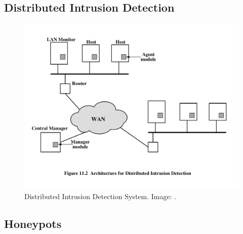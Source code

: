 \subsection{Distributed Intrusion Detection}

\begin{frame}
  \begin{figure}
    \includegraphics[height=0.7\textheight]{figs/dids.pdf}
    \caption{Distributed Intrusion Detection System.
      Image: \cite{Stallings2013nse}.}
  \end{figure}
\end{frame}

\subsection{Honeypots}

